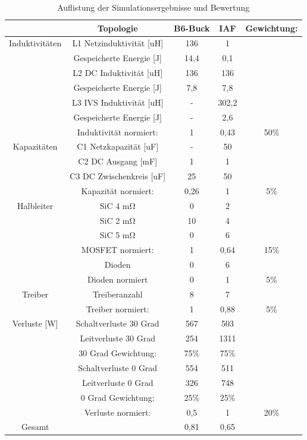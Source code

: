 \begin{table}
	\centering
\begin{tabular}{|c|c|c|c|c|}
	\hline
	& Topologie & B6-Buck & \gls{IAF} & Gewichtung: \\
	\hline
	Induktivitäten& L1 Netzinduktivität [uH]& 136 & 1 &  \\
	\hline
	 & Gespeicherte Energie [J]& 14,4 & 0,1 & \\
	\hline
	& L2 DC Induktivität [uH]& 136 & 136 &  \\
	\hline
	& Gespeicherte Energie [J]& 7,8 & 7,8 &  \\
	\hline
	& L3 IVS Induktivität [uH]& - & 302,2 &  \\
	\hline
	& Gespeicherte Energie [J] & - & 2,6 & \\
	\hline
	& Induktivität normiert: &\cellcolor{red!25}  1 & \cellcolor{green!25} 0,43 & 50\% \\
	\hline
	Kapazitäten & C1 Netzkapazität [uF]& - & 50 &  \\
	\hline
	& C2 DC Ausgang [mF]& 1 & 1 &  \\
	\hline
	& C3 DC Zwischenkreis [uF]& 25 & 50 &  \\
	\hline
	& Kapazität normiert: & \cellcolor{green!25} 0,26 & \cellcolor{red!25} 1 & 5\% \\
	\hline
	Halbleiter & SiC 4 \si{\milli \ohm} & 0 & 2 &  \\
	\hline
	& SiC 2 \si{\milli \ohm} & 10 & 4 &  \\
	\hline
	& SiC 5 \si{\milli \ohm} & 0 & 6 &  \\
	\hline
	& MOSFET normiert: & \cellcolor{red!25} 1 & \cellcolor{yellow!25} 0,64 & 15\% \\
	\hline
	& Dioden & 0 & 6 &  \\
	\hline
	& Dioden normiert &\cellcolor{green!25} 0 & \cellcolor{red!25} 1 & 5\% \\
	\hline
	Treiber & Treiberanzahl & 8 & 7 &  \\
	\hline
	& Treiber normiert: & \cellcolor{red!25}1 & \cellcolor{yellow!25} 0,88 & 5\% \\
	\hline
	Verluste [W] & Schaltverluste 30 Grad & 567 & 503 &  \\
	\hline
	& Leitverluste 30 Grad & 254 & 1311 &  \\
	\hline
	& 30 Grad Gewichtung: & 75\% & 75\% &  \\
	\hline
	& Schaltverluste 0 Grad & 554 & 511 &  \\
	\hline
	& Leitverluste 0 Grad & 326 & 748 &  \\
	\hline
	& 0 Grad Gewichtung: & 25\% & 25\% &  \\
	\hline
	& Verluste normiert: &\cellcolor{yellow!25} 0,5 & \cellcolor{red!25} 1 & 20\% \\
	\hline
	Gesamt &  & \cellcolor{red!25} 0,81 & \cellcolor{yellow!25} 0,65 & \\
	\hline
\end{tabular}
\caption{Auflistung der Simulationsergebnisse und Bewertung}
\label{tab:Auswertung}
\end{table}

